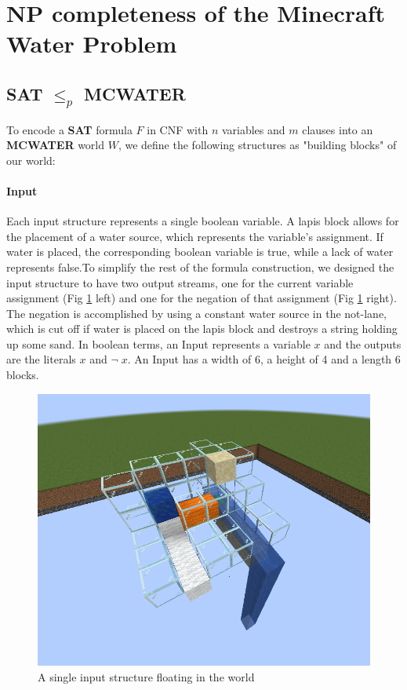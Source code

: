 \section{NP completeness of the Minecraft Water Problem}


\subsection{SAT $\leq_p$ MCWATER}
To encode a \textbf{SAT} formula $F$ in CNF with $n$ variables and $m$ clauses into an \textbf{MCWATER} world $W$, we define the following structures as "building blocks" of our world:



\paragraph{Input}
Each input structure represents a single boolean variable. A lapis block allows for the placement of a water source, which represents the variable's assignment. If water is placed, the corresponding boolean variable is true, while a lack of water represents false.\newline To simplify the rest of the formula construction, we designed the input structure to have two output streams, one for the current variable assignment (Fig \ref{fig:input} left) and one for the negation of that assignment (Fig \ref{fig:input} right). The negation is accomplished by using a constant water source in the not-lane, which is cut off if water is placed on the lapis block and destroys a string holding up some sand. In boolean terms, an Input represents a variable $x$ and the outputs are the literals $x$ and $\neg \; x$. An Input has a width of 6, a height of 4 and a length 6 blocks.

\begin{figure}[ht]
    \centering
    \includegraphics[width=0.5\linewidth]{images/input.png}
    \caption{A single input structure floating in the world}
    \label{fig:input}
\end{figure}



